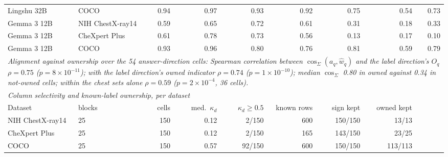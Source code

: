 \documentclass{article}
\providecommand{\DIFaddendFL}{} %
\DeclareRobustCommand{\DIFaddendFL}{\DIFOaddendFL \let\includegraphics\DIFOincludegraphics} %
\begin{document}
\begin{table}[h]
{\begin{tabular}{llrrrrrrr}
Lingshu 32B & COCO & 0.94 & 0.97 & 0.93 & 0.92 & 0.75 & 0.54 & 0.73 \\
Gemma 3 12B & NIH ChestX-ray14 & 0.59 & 0.65 & 0.72 & 0.61 & 0.31 & 0.18 & 0.33 \\
Gemma 3 12B & CheXpert Plus & 0.61 & 0.78 & 0.73 & 0.56 & 0.13 & 0.17 & 0.10 \\
Gemma 3 12B & COCO & 0.93 & 0.96 & 0.80 & 0.76 & 0.81 & 0.59 & 0.79 \\
\midrule
\multicolumn{9}{p{1.314\linewidth}}{\textit{Alignment against ownership over the 54 answer-direction cells: Spearman correlation between $\cos_\Sigma(a_q,\hat w_q)$ and the label direction's $O_q$ $\rho=0.75$ ($p=8\times10^{-11}$); with the label direction's owned indicator $\rho=0.74$ ($p=1\times10^{-10}$); median $\cos_\Sigma$ 0.80 in owned against 0.34 in not-owned cells; within the chest sets alone $\rho=0.59$ ($p=2\times10^{-4}$, 36 cells).}} \\
\midrule
\multicolumn{9}{l}{\textit{Column selectivity and known-label ownership, per dataset}} \\
Dataset & blocks & cells & med.\ $\kappa_d$ & $\kappa_d\geq0.5$ & known rows & sign kept & owned kept & \\
\midrule
NIH ChestX-ray14 & 25 & 150 & 0.12 & 2/150 & 600 & 150/150 & 13/13 & \\
CheXpert Plus & 25 & 150 & 0.12 & 2/150 & 165 & 143/150 & 23/25 & \\
COCO & 25 & 150 & 0.57 & 92/150 & 600 & 150/150 & 113/113 & \\
\bottomrule
\end{tabular}}
\DIFaddendFL \end{table}
\end{document}
